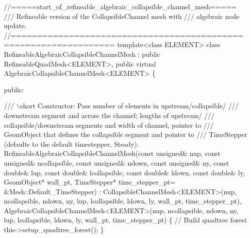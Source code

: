 
\begin{DoxyCodeInclude}
\textcolor{comment}{//=====start\_of\_refineable\_algebraic\_collapsible\_channel\_mesh=====}
\textcolor{comment}{/// Refineable version of the CollapsibleChannel mesh with}
\textcolor{comment}{}\textcolor{comment}{/// algebraic node update.}
\textcolor{comment}{}\textcolor{comment}{//=================================================================}
\textcolor{keyword}{template}<\textcolor{keyword}{class} ELEMENT>
\textcolor{keyword}{class }RefineableAlgebraicCollapsibleChannelMesh : 
  \textcolor{keyword}{public} RefineableQuadMesh<ELEMENT>,
  \textcolor{keyword}{public} \textcolor{keyword}{virtual} AlgebraicCollapsibleChannelMesh<ELEMENT>
\{ 

\textcolor{keyword}{public}: 

\textcolor{comment}{}
\textcolor{comment}{ /// \(\backslash\)short Constructor: Pass number of elements in upstream/collapsible/}
\textcolor{comment}{ /// downstream segment and across the channel; lengths of upstream/}
\textcolor{comment}{ /// collapsible/downstream segments and width of channel, pointer to }
\textcolor{comment}{ /// GeomObject that defines the collapsible segment and pointer to }
\textcolor{comment}{ /// TimeStepper (defaults to the default timestepper, Steady). }
\textcolor{comment}{} RefineableAlgebraicCollapsibleChannelMesh(\textcolor{keyword}{const} \textcolor{keywordtype}{unsigned}& nup, 
                                           \textcolor{keyword}{const} \textcolor{keywordtype}{unsigned}& ncollapsible, 
                                           \textcolor{keyword}{const} \textcolor{keywordtype}{unsigned}& ndown, 
                                           \textcolor{keyword}{const} \textcolor{keywordtype}{unsigned}& ny, 
                                           \textcolor{keyword}{const} \textcolor{keywordtype}{double}& lup, 
                                           \textcolor{keyword}{const} \textcolor{keywordtype}{double}& lcollapsible, 
                                           \textcolor{keyword}{const} \textcolor{keywordtype}{double}& ldown, 
                                           \textcolor{keyword}{const} \textcolor{keywordtype}{double}& ly,
                                           GeomObject* wall\_pt,
                                           TimeStepper* time\_stepper\_pt=
                                           &Mesh::Default\_TimeStepper) :
  CollapsibleChannelMesh<ELEMENT>(nup, ncollapsible, ndown, ny,
                                  lup, lcollapsible, ldown, ly,
                                  wall\_pt,
                                  time\_stepper\_pt),
  AlgebraicCollapsibleChannelMesh<ELEMENT>(nup, ncollapsible, ndown, ny,
                                           lup, lcollapsible, ldown, ly,
                                           wall\_pt,
                                           time\_stepper\_pt)
  \{
   \textcolor{comment}{// Build quadtree forest}
   this->setup\_quadtree\_forest();
  \}

\end{DoxyCodeInclude}


